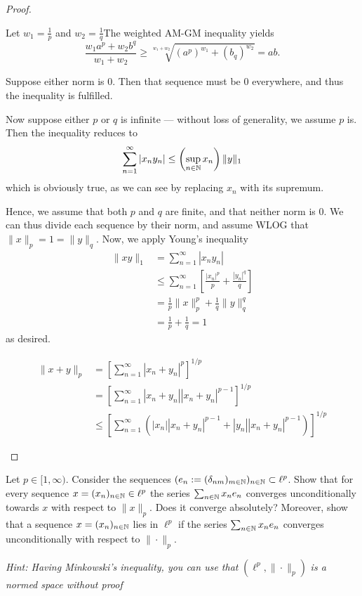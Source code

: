 \begin{proof}
	\begin{parts}
		\item Let $w_1=\frac{1}{p}$ and $w_2=\frac{1}{q}$The weighted AM-GM inequality yields
		\[
		\frac{w_1 a^p + w_2 b^q}{w_1+w_2}\ge \sqrt[w_1+w_2]{(a^p)^{w_1}+(b_q)^{w_2}} =ab
		.\]
		\item Suppose either norm is 0. Then that sequence must be 0 everywhere, and thus the inequality is fulfilled. 
		
		Now suppose either $p$ or $q$ is infinite --- without loss of generality, we assume $p$ is. Then the inequality reduces to
		\[\sum_{n=1}^\infty |x_n y_n| \le \left(\sup_{n\in \mathbb{N}} x_n\right) \|y\|_1\]
		which is obviously true, as we can see by replacing $x_n$ with its supremum. 
		
		Hence, we assume that both $p$ and $q$ are finite, and that neither norm is $0$. We can thus divide each sequence by their norm, and assume WLOG that $\|x\|_p=1=\|y\|_q$.  Now, we apply Young's inequality
		\begin{align*}
			\|xy\|_1 &= \sum_{n=1}^\infty |x_n y_n|\\
			&\le\sum_{n=1}^{\infty} \left[ \frac{|x_n|^p}{p}+\frac{|y_n|^q}{q} \right] \\
			&=\frac{1}{p}\|x\|_p^p+\frac{1}{q}\|y \|_q^q\\
			&=\frac{1}{p}+\frac{1}{q}=1
		\end{align*}
	as desired. 
	\item 
	\begin{align*}
		\|x+y\|_p &= \left[\sum_{n=1}^\infty |x_n+y_n|^p\right]^{1/p}\\
		&=\left[\sum_{n=1}^\infty |x_n+y_n||x_n+y_n|^{p-1}\right]^{1/p}\\
		&\le\left[\sum_{n=1}^\infty \left(|x_n||x_n+y_n|^{p-1}+|y_n| |x_n+y_n|^{p-1}\right)\right]^{1/p}
	\end{align*}
	\end{parts}
\end{proof}
\begin{Problem}
	Let $p\in [1,\infty)$. Consider the sequences $(e_n:=(\delta_{nm})_{m\in \mathbb{N}})_{n\in \mathbb{N}}\subset \ell^p$. Show that for every sequence $x=(x_n)_{n\in \mathbb{N}}\in \ell^p$ the series $\sum_{n\in \mathbb{N}} x_n e_n$ converges unconditionally towards $x$ with respect to $\|x\|_p$. Does it converge absolutely? Moreover, show that a sequence $x=(x_n)_{n\in \mathbb{N}}$ lies in $\ell^p$ if the series $\sum_{n\in \mathbb{N}}x_n e_n$ converges unconditionally with respect to $\|\cdot\|_p$.

	\emph{Hint: Having Minkowski's inequality, you can use that } $(\ell^p, \|\cdot\|_p)$ \emph{is a normed space without proof}
\end{Problem}
